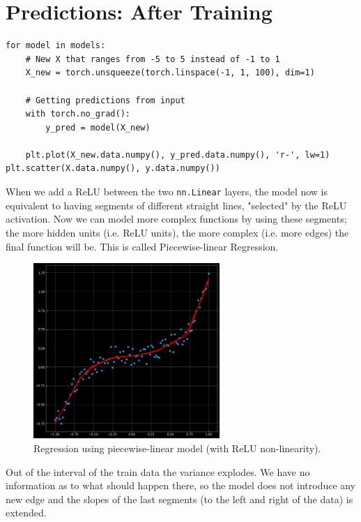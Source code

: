         \section{Predictions: After Training}
        \begin{verbatim}
for model in models:
    # New X that ranges from -5 to 5 instead of -1 to 1
    X_new = torch.unsqueeze(torch.linspace(-1, 1, 100), dim=1)

    # Getting predictions from input
    with torch.no_grad():
        y_pred = model(X_new)
        
    plt.plot(X_new.data.numpy(), y_pred.data.numpy(), 'r-', lw=1)
plt.scatter(X.data.numpy(), y.data.numpy())
        \end{verbatim}
        When we add a ReLU between the two \texttt{nn.Linear} layers, the model now is equivalent to having segments of different straight lines, "selected" by the ReLU activation. 
        Now we can model more complex functions by using these segments; the more hidden units (i.e. ReLU units), the more complex (i.e. more edges) the final function will be. This is called Piecewise-linear Regression.
        \begin{figure}[H]
        \begin{center}
        \includegraphics[width=200pt]{labs/03/images/05-piecewise_reg.png}
        \end{center} 
        \caption{Regression using piecewise-linear model (with ReLU non-linearity).}
        \end{figure}
        Out of the interval of the train data the variance explodes. 
        We have no information as to what should happen there, so the model does not introduce any new edge and the slopes of the last segments (to the left and right of the data) is extended.
        
